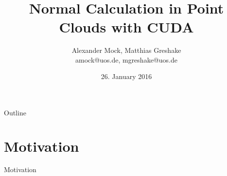 \documentclass{beamer}
\begin{document}
\title{Normal Calculation in Point Clouds with CUDA}
\author[Matthias Greshake, Alexander Mock]{Alexander Mock, Matthias Greshake\\ {\scriptsize amock@uos.de, mgreshake@uos.de}}
\date{26. January 2016}

\begin{frame}[plain]
	\titlepage
\end{frame}

\begin{frame}{Outline}
	\tableofcontents
\end{frame}

\section{Motivation}

\begin{frame}{Motivation}
	\centering
\end{frame}
\end{document}
